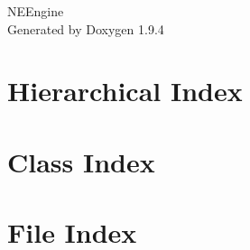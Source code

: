 \documentclass[twoside]{book}
\newcommand{\+}{\discretionary{\mbox{\scriptsize$\hookleftarrow$}}{}{}}
\newcommand{\clearemptydoublepage}{%
    \newpage{\pagestyle{empty}\cleardoublepage}%
  }
\begin{document}
  \raggedbottom
    \hypersetup{pageanchor=false,
                bookmarksnumbered=true,
                pdfencoding=unicode
               }
  \begin{titlepage}
  \vspace*{7cm}
  \begin{center}%
  {\Large NEEngine}\\
  \vspace*{1cm}
  {\large Generated by Doxygen 1.9.4}\\
  \end{center}
  \end{titlepage}
  \clearemptydoublepage
  \tableofcontents
  \clearemptydoublepage
  \hypersetup{pageanchor=true}
\chapter{Hierarchical Index}

\chapter{Class Index}

\chapter{File Index}

\end{document}
